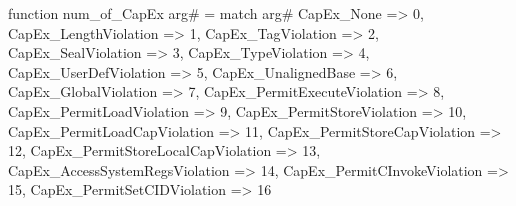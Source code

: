 function num_of_CapEx arg# = match arg# {
  CapEx_None => 0,
  CapEx_LengthViolation => 1,
  CapEx_TagViolation => 2,
  CapEx_SealViolation => 3,
  CapEx_TypeViolation => 4,
  CapEx_UserDefViolation => 5,
  CapEx_UnalignedBase => 6,
  CapEx_GlobalViolation => 7,
  CapEx_PermitExecuteViolation => 8,
  CapEx_PermitLoadViolation => 9,
  CapEx_PermitStoreViolation => 10,
  CapEx_PermitLoadCapViolation => 11,
  CapEx_PermitStoreCapViolation => 12,
  CapEx_PermitStoreLocalCapViolation => 13,
  CapEx_AccessSystemRegsViolation => 14,
  CapEx_PermitCInvokeViolation => 15,
  CapEx_PermitSetCIDViolation => 16
}
